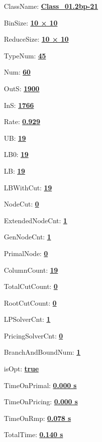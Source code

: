 \documentclass[11pt]{article}
\begin{document}
\pagestyle{empty}


ClassName: \underline{\textbf{Class_01.2bp-21}}
\par
BinSize: \underline{\textbf{10 × 10}}
\par
ReduceSize: \underline{\textbf{10 × 10}}
\par
TypeNum: \underline{\textbf{45}}
\par
Num: \underline{\textbf{60}}
\par
OutS: \underline{\textbf{1900}}
\par
InS: \underline{\textbf{1766}}
\par
Rate: \underline{\textbf{0.929}}
\par
UB: \underline{\textbf{19}}
\par
LB0: \underline{\textbf{19}}
\par
LB: \underline{\textbf{19}}
\par
LBWithCut: \underline{\textbf{19}}
\par
NodeCut: \underline{\textbf{0}}
\par
ExtendedNodeCnt: \underline{\textbf{1}}
\par
GenNodeCnt: \underline{\textbf{1}}
\par
PrimalNode: \underline{\textbf{0}}
\par
ColumnCount: \underline{\textbf{19}}
\par
TotalCutCount: \underline{\textbf{0}}
\par
RootCutCount: \underline{\textbf{0}}
\par
LPSolverCnt: \underline{\textbf{1}}
\par
PricingSolverCnt: \underline{\textbf{0}}
\par
BranchAndBoundNum: \underline{\textbf{1}}
\par
isOpt: \underline{\textbf{true}}
\par
TimeOnPrimal: \underline{\textbf{0.000 s}}
\par
TimeOnPricing: \underline{\textbf{0.000 s}}
\par
TimeOnRmp: \underline{\textbf{0.078 s}}
\par
TotalTime: \underline{\textbf{0.140 s}}
\par
\newpage


\end{document}
